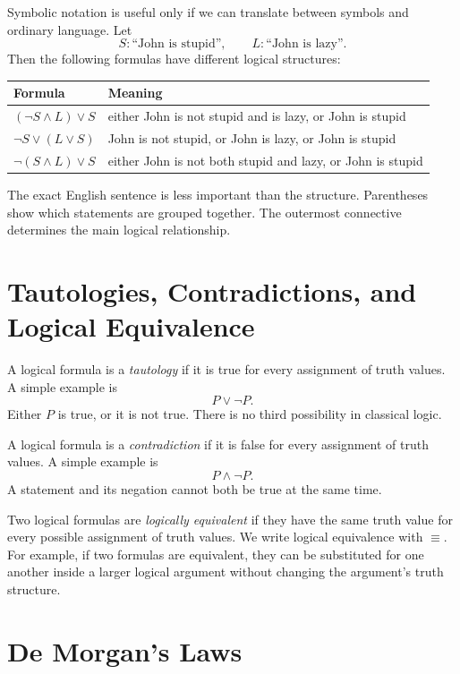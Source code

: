 Symbolic notation is useful only if we can translate between symbols and ordinary language. Let
\[
S: \text{``John is stupid''},
\qquad
L: \text{``John is lazy''}.
\]
Then the following formulas have different logical structures:
\begin{center}
\begin{tabular}{p{} p{}}
\hline
Formula & Meaning \\
\hline
\((\neg S \land L) \lor S\) & either John is not stupid and is lazy, or John is stupid \\
\(\neg S \lor (L \lor S)\) & John is not stupid, or John is lazy, or John is stupid \\
\(\neg(S \land L) \lor S\) & either John is not both stupid and lazy, or John is stupid \\
\hline
\end{tabular}
\end{center}
The exact English sentence is less important than the structure. Parentheses show which statements are grouped together. The outermost connective determines the main logical relationship.

\section{Tautologies, Contradictions, and Logical Equivalence}
\label{mf:logic-tautology-contradiction}
\label{mf:logic-equivalence}

A logical formula is a \emph{tautology} if it is true for every assignment of truth values. A simple example is
\[
P \lor \neg P.
\]
Either \(P\) is true, or it is not true. There is no third possibility in classical logic.

A logical formula is a \emph{contradiction} if it is false for every assignment of truth values. A simple example is
\[
P \land \neg P.
\]
A statement and its negation cannot both be true at the same time.

Two logical formulas are \emph{logically equivalent} if they have the same truth value for every possible assignment of truth values. We write logical equivalence with \(\equiv\). For example, if two formulas are equivalent, they can be substituted for one another inside a larger logical argument without changing the argument's truth structure.

\section{De Morgan's Laws}
\label{mf:logic-demorgan}

